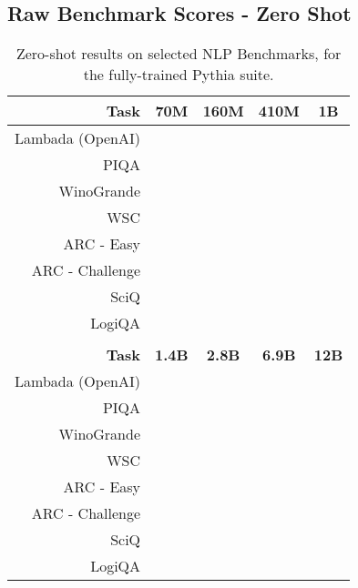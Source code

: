 \documentclass{article}
\theoremstyle{plain}
\theoremstyle{definition}
\theoremstyle{remark}
\begin{document}
\subsection{Raw Benchmark Scores - Zero Shot}\label{app:raw-zeroshot}
\begin{table}[H]
\centering
\begin{tabular}{rcccc}
\toprule
\textbf{Task} & \textbf{70M} & \textbf{160M} & \textbf{410M} & \textbf{1B} \\
\midrule
Lambada (OpenAI) &  &  &  &  \\
PIQA &  &  &  &  \\
WinoGrande &  &  &  &  \\
WSC &  &  &  &   \\
ARC - Easy &  &  &  &  \\
ARC - Challenge &  &  &  &   \\
SciQ &  &  &  &   \\
LogiQA &  &  &  &   \\
\bottomrule
\\
\textbf{Task} & \textbf{1.4B} & \textbf{2.8B} & \textbf{6.9B} & \textbf{12B} \\
\midrule
Lambada (OpenAI) &  &  &  &  \\
PIQA & &  &  &  \\
WinoGrande & &  &  &  \\
WSC &  &  &  &  \\
ARC - Easy &  &  &  &  \\
ARC - Challenge &  &  &  &  \\
SciQ &  &  &  &  \\
LogiQA & &  &  &  \\
\bottomrule
\end{tabular}
\caption{Zero-shot results on selected NLP Benchmarks, for the fully-trained Pythia suite.}
\end{table}
\end{document}

